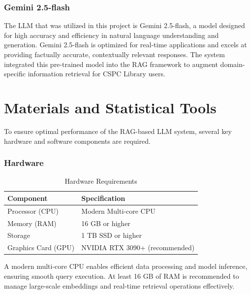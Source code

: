 \begin{refsection}
\subsubsection{Gemini 2.5-flash}

The LLM that was utilized in this project is Gemini 2.5-flash, a model designed for high accuracy and efficiency in natural language understanding and generation. Gemini 2.5-flash is optimized for real-time applications and excels at providing factually accurate, contextually relevant responses. The system integrated this pre-trained model into the RAG framework to augment domain-specific information retrieval for CSPC Library users.

\section{Materials and Statistical Tools}

To ensure optimal performance of the RAG-based LLM system, several key hardware and software components are required.

\subsubsection{Hardware}

\begin{table}[H]
    \centering
    \caption{Hardware Requirements}
    \label{tab:hardware_requirements}
    \begin{tabular}{ll}
        \hline
        \textbf{Component}       & \textbf{Specification}                     \\ \hline
        Processor (CPU)          & Modern Multi-core CPU                      \\
        Memory (RAM)             & 16 GB or higher                            \\
        Storage                  & 1 TB SSD or higher                         \\
        Graphics Card (GPU)      & NVIDIA RTX 3090+ (recommended)             \\
        \hline
    \end{tabular}
\end{table}

A modern multi-core CPU enables efficient data processing and model inference, ensuring smooth query execution. At least 16 GB of RAM is recommended to manage large-scale embeddings and real-time retrieval operations effectively. 


\end{refsection}
